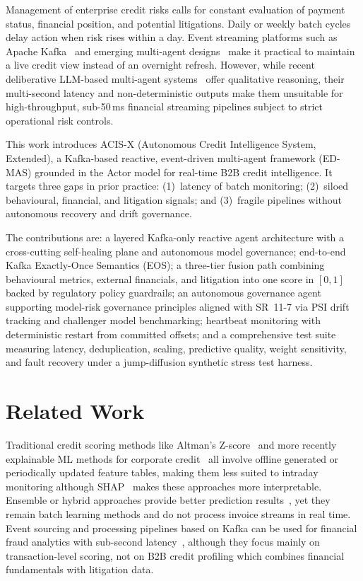\documentclass[conference]{IEEEtran}
\begin{document}
Management of enterprise credit risks calls for constant evaluation of payment status, financial position, and potential litigations. Daily or weekly batch cycles delay action when risk rises within a day. Event streaming platforms such as Apache Kafka~\cite{kreps2011kafka} and emerging multi-agent designs~\cite{jajoo2025masca,kubam2026agentic} make it practical to maintain a live credit view instead of an overnight refresh. However, while recent deliberative LLM-based multi-agent systems~\cite{jajoo2025masca,kou2025learning} offer qualitative reasoning, their multi-second latency and non-deterministic outputs make them unsuitable for high-throughput, sub-50\,ms financial streaming pipelines subject to strict operational risk controls.

This work introduces ACIS-X (Autonomous Credit Intelligence System, Extended), a Kafka-based reactive, event-driven multi-agent framework (ED-MAS) grounded in the Actor model for real-time B2B credit intelligence. It targets three gaps in prior practice: (1)~latency of batch monitoring; (2)~siloed behavioural, financial, and litigation signals; and (3)~fragile pipelines without autonomous recovery and drift governance.

The contributions are: a layered Kafka-only reactive agent architecture with a cross-cutting self-healing plane and autonomous model governance; end-to-end Kafka Exactly-Once Semantics (EOS); a three-tier fusion path combining behavioural metrics, external financials, and litigation into one score in $[0,1]$ backed by regulatory policy guardrails; an autonomous governance agent supporting model-risk governance principles aligned with SR~11-7 via PSI drift tracking and challenger model benchmarking; heartbeat monitoring with deterministic restart from committed offsets; and a comprehensive test suite measuring latency, deduplication, scaling, predictive quality, weight sensitivity, and fault recovery under a jump-diffusion synthetic stress test harness.

\section{Related Work}
\label{sec:related}

Traditional credit scoring methods like Altman's Z-score~\cite{altman1968financial} and more recently explainable ML methods for corporate credit~\cite{chang2025explainable,nwafor2024hybrid} all involve offline generated or periodically updated feature tables, making them less suited to intraday monitoring although SHAP~\cite{lundberg2020local} makes these approaches more interpretable. Ensemble or hybrid approaches provide better prediction results~\cite{nwafor2024hybrid}, yet they remain batch learning methods and do not process invoice streams in real time. Event sourcing and processing pipelines based on Kafka can be used for financial fraud analytics with sub-second latency~\cite{kesarpu2025kafka,parnerkar2025eda}, although they focus mainly on transaction-level scoring, not on B2B credit profiling which combines financial fundamentals with litigation data.
\end{document}
